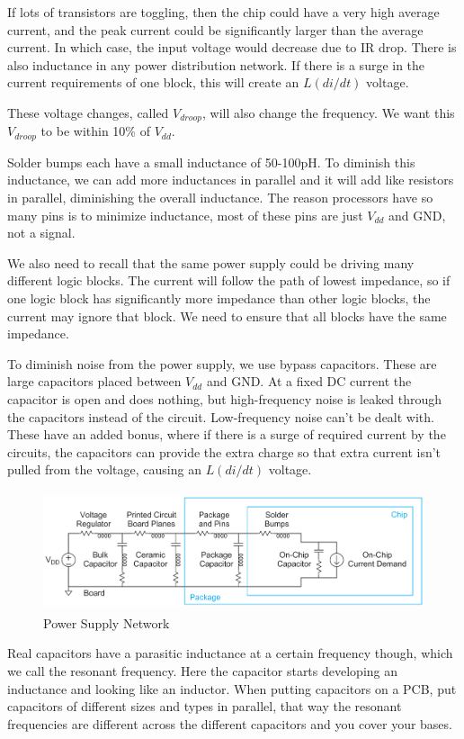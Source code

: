 \documentclass{article}
\begin{document}
If lots of transistors are toggling, then the chip could have a very high average current, and the peak current could be significantly larger than the average current. In which case, the input voltage would decrease due to IR drop. There is also inductance in any power distribution network. If there is a surge in the current requirements of one block, this will create an $L(di/dt)$ voltage.

These voltage changes, called $V_{droop}$, will also change the frequency. We want this $V_{droop}$ to be within 10\% of $V_{dd}$. 


Solder bumps each have a small inductance of 50-100pH. To diminish this inductance, we can add more inductances in parallel and it will add like resistors in parallel, diminishing the overall inductance. The reason processors have so many pins is to minimize inductance, most of these pins are just $V_{dd}$ and GND, not a signal. 

We also need to recall that the same power supply could be driving many different logic blocks. The  current will follow the path of lowest impedance, so if one logic block has significantly more impedance than other logic blocks, the current may ignore that block. We need to ensure that all blocks have the same impedance. 

To diminish noise from the power supply, we use bypass capacitors. These are large capacitors placed between $V_{dd}$ and GND. At a fixed DC current the capacitor is open and does nothing, but high-frequency noise is leaked through the capacitors instead of the circuit. Low-frequency noise can't be dealt with. These have an added bonus, where if there is a surge of required current by the circuits, the capacitors can provide the extra charge so that extra current isn't pulled from the voltage, causing an $L(di/dt)$ voltage.

\begin{figure}[ht!]
\centering
\includegraphics[height=35mm]{Power.png}
\caption{Power Supply Network}
\end{figure}

Real capacitors have a parasitic inductance at a certain frequency though, which we call the resonant frequency. Here the capacitor starts developing an inductance and looking like an inductor. When putting capacitors on a PCB, put capacitors of different sizes and types in parallel, that way the resonant frequencies are different across the different capacitors and you cover your bases.
\end{document}
